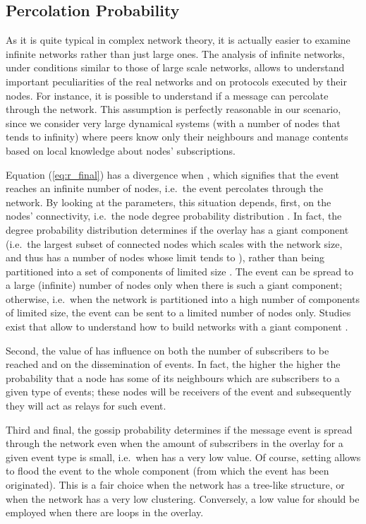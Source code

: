 \documentclass[10pt, conference, compsocconf]{IEEEtran}
\begin{document}
\subsection{Percolation Probability}

As it is quite typical in complex network theory, it is actually easier to examine infinite networks rather than just large ones. The analysis of infinite networks, under conditions similar to those of large scale networks, allows to understand important peculiarities of the real networks and on protocols executed by their nodes. For instance, it is possible to understand if a message can percolate through the network.
This assumption is perfectly reasonable in our scenario, since we consider very large dynamical systems (with a number of nodes that tends to infinity) where peers know only their neighbours and manage contents based on local knowledge about nodes' subscriptions.

Equation (\ref{eq:r_final}) has a divergence when , which signifies that the event reaches an infinite number of nodes, i.e.~the event percolates through the network.
By looking at the parameters, this situation depends, first, on the nodes' connectivity, i.e.~the node degree probability distribution . In fact, the degree probability distribution determines if the overlay has a giant component (i.e.~the largest subset of connected nodes which scales with the network size, and thus has a number of nodes whose limit tends to ), rather than being partitioned into a set of components of limited size \cite{newmanHandbook}. 
The event can be spread to a large (infinite) number of nodes only when there is such a giant component; otherwise, i.e.~when the network is partitioned into a high number of components of limited size,
the event can be sent to a limited number of nodes only. Studies exist that allow to understand how to build networks with a giant component \cite{Flaxman:2005,newmanHandbook}.

Second, the value of  has influence on both the number of subscribers to be reached and on the dissemination of events. In fact, the higher  the higher the probability that a node has some of its neighbours which are subscribers to a given type of events; these nodes will be receivers of the event and subsequently they will act as relays for such event. 

Third and final, the gossip probability  determines if the message event is spread through the network even when the amount of subscribers in the overlay for a given event type is small, i.e.~when  has a very low value. Of course, setting  allows to flood the event to the whole component (from which the event has been originated). This is a fair choice when the network has a tree-like structure, or when the network has a very low clustering. Conversely, a low value for  should be employed when there are loops in the overlay.
\end{document}
